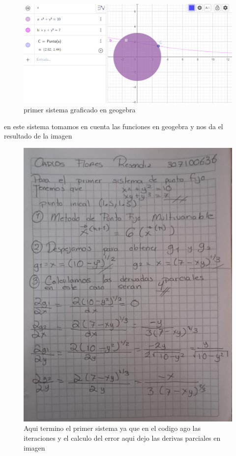 \documentclass{article}
\begin{document}
\begin{figure}
            \centering
            \includegraphics[width=1.5\linewidth]{puntio fijo para el primer sistema.PNG}
            \caption{primer sistema graficado en geogebra}
            \label{fig:enter-label}
        \end{figure}
        
\item en este sistema tomamos en cuenta las funciones en geogebra y nos da el resultado de la imagen 


\begin{figure}
            \centering
            \includegraphics[width=1\linewidth]{derivadas parciales 1er sistema.PNG}
            \caption{Aqui termino el primer sistema ya que en el codigo ago las iteraciones y el calculo del error aqui dejo las derivas parciales en imagen}
            \label{blackhole}
    
\end{figure}
\end{document}
